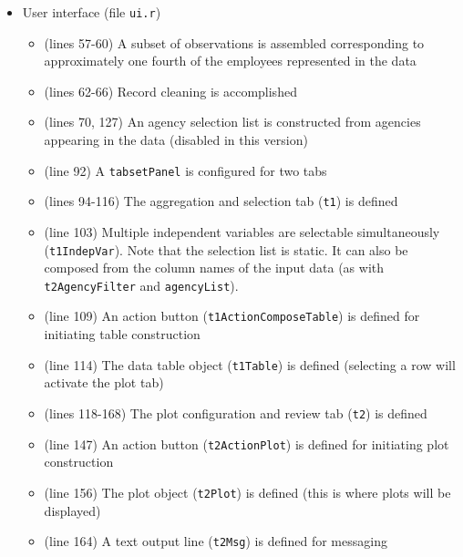 \documentclass[10pt, letterpaper]{article}
\begin{document}
\begin{spacing}{1.0}
\begin{itemize}
    \item User interface (file \texttt{ui.r})
      \begin{itemize}
        \item (lines 57-60) A subset of observations is assembled corresponding to approximately one fourth of the employees represented in the data
        \item (lines 62-66) Record cleaning is accomplished
        \item (lines 70, 127) An agency selection list is constructed from agencies appearing in the data (disabled in this version)
        \item (line 92) A \texttt{tabsetPanel} is configured for two tabs
        \item (lines 94-116) The aggregation and selection tab (\texttt{t1}) is defined
        \item (line 103) Multiple independent variables are selectable simultaneously (\texttt{t1IndepVar}).  Note that the selection list is static.  It can also be composed from the column names of the input data (as with \texttt{t2AgencyFilter} and \texttt{agencyList}).
        \item (line 109) An action button (\texttt{t1ActionComposeTable}) is defined for initiating table construction
        \item (line 114) The data table object (\texttt{t1Table}) is defined (selecting a row will activate the plot tab)
        \item (lines 118-168) The plot configuration and review tab (\texttt{t2}) is defined
        \item (line 147) An action button (\texttt{t2ActionPlot}) is defined for initiating plot construction
        \item (line 156) The plot object (\texttt{t2Plot}) is defined (this is where plots will be displayed)
        \item (line 164) A text output line (\texttt{t2Msg}) is defined for messaging
      \end{itemize}


\end{itemize}
\end{spacing}
\end{document}
